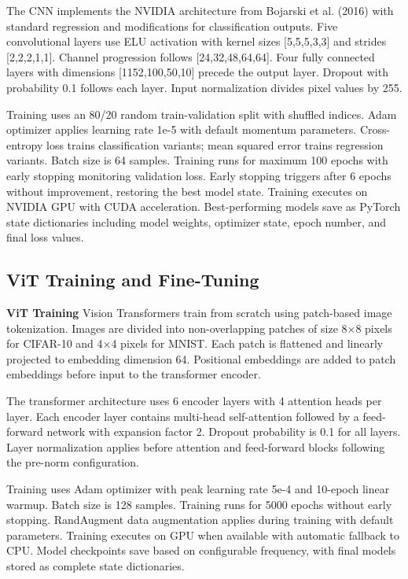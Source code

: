 The CNN implements the NVIDIA architecture from Bojarski et al. (2016) \cite{bojarski2016end} with standard regression and modifications for classification outputs. Five convolutional layers use ELU activation with kernel sizes [5,5,5,3,3] and strides [2,2,2,1,1]. Channel progression follows [24,32,48,64,64]. Four fully connected layers with dimensions [1152,100,50,10] precede the output layer. Dropout with probability 0.1 follows each layer. Input normalization divides pixel values by 255.

Training uses an 80/20 random train-validation split with shuffled indices. Adam optimizer applies learning rate 1e-5 with default momentum parameters. Cross-entropy loss trains classification variants; mean squared error trains regression variants. Batch size is 64 samples. Training runs for maximum 100 epochs with early stopping monitoring validation loss. Early stopping triggers after 6 epochs without improvement, restoring the best model state. Training executes on NVIDIA GPU with CUDA acceleration. Best-performing models save as PyTorch state dictionaries including model weights, optimizer state, epoch number, and final loss values.


\subsection{ViT Training and Fine-Tuning}

\textbf{ViT Training}
\label{methods:vit_from_scratch}
Vision Transformers train from scratch using patch-based image tokenization. Images are divided into non-overlapping patches of size 8×8 pixels for CIFAR-10 and 4×4 pixels for MNIST. Each patch is flattened and linearly projected to embedding dimension 64. Positional embeddings are added to patch embeddings before input to the transformer encoder.

The transformer architecture uses 6 encoder layers with 4 attention heads per layer. Each encoder layer contains multi-head self-attention followed by a feed-forward network with expansion factor 2. Dropout probability is 0.1 for all layers. Layer normalization applies before attention and feed-forward blocks following the pre-norm configuration.

Training uses Adam optimizer with peak learning rate 5e-4 and 10-epoch linear warmup. Batch size is 128 samples. Training runs for 5000 epochs without early stopping. RandAugment data augmentation applies during training with default parameters. Training executes on GPU when available with automatic fallback to CPU. Model checkpoints save based on configurable frequency, with final models stored as complete state dictionaries.

